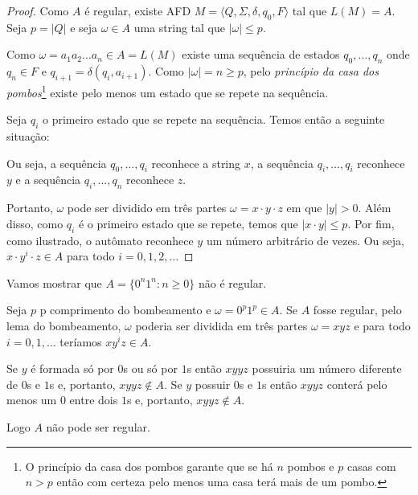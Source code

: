 \begin{proof}
Como $A$ é regular, existe AFD $M = \langle Q, \Sigma, \delta, q_0, F \rangle$ tal que $L(M) = A$.
Seja $p = |Q|$ e seja $\omega \in A$ uma string tal que $|\omega| \leq p$.

Como $\omega = a_1 a_2 \dots a_n \in A = L(M)$ existe uma sequência de estados $q_0, \dots, q_n$ onde $q_n \in F$ e $q_{i+1} = \delta(q_i, a_{i+1})$.
Como $|\omega| = n \geq p$, pelo {\em princípio da casa dos pombos}\footnote{O princípio da casa dos pombos garante que se há $n$ pombos e $p$ casas com $n > p$ então com certeza pelo menos uma casa terá mais de um pombo.} existe pelo menos um estado que se repete na sequência.

Seja $q_i$ o primeiro estado que se repete na sequência.
Temos então a seguinte situação:

\begin{center}
\end{center}

Ou seja, a sequência $q_0, \dots, q_i$ reconhece a string $x$, a sequência $q_i, \dots, q_i$ reconhece $y$ e a sequência $q_i, \dots, q_n$ reconhece $z$.

Portanto, $\omega$ pode ser dividido em três partes $\omega = x \cdot y \cdot z$ em que $|y| > 0$.
Além disso, como $q_i$ é o primeiro estado que se repete, temos que $|x \cdot y| \leq p$.
Por fim, como ilustrado, o autômato reconhece $y$ um número arbitrário de vezes.
Ou seja, $x \cdot y^i \cdot z \in A$ para todo $i = 0, 1, 2, \dots$
\end{proof}



\begin{example}
  Vamos mostrar que $A = \{0^n 1^n: n \geq 0\}$ não é regular.

  Seja $p$ p comprimento do bombeamento e $\omega = 0^p 1^p \in A$.
  Se $A$ fosse regular, pelo lema do bombeamento, $\omega$ poderia ser dividida em três partes $\omega = x  y  z$ e para todo $i = 0, 1, \dots$ teríamos $x  y^i  z \in A$.

Se $y$ é formada só por $0$s ou só por $1$s então $x  y  y  z$ possuiria um número diferente de $0$s e $1$s e, portanto, $x  y  y  z \notin A$.
Se $y$ possuir $0$s e $1$s então $x  y  y  z$ conterá pelo menos um $0$ entre dois $1$s e, portanto, $x  y  y  z \notin A$.

Logo $A$ não pode ser regular.
\end{example}

